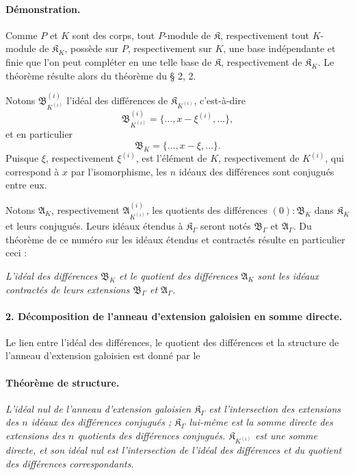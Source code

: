 \paragraph{Démonstration.}
Comme $P$ et $K$ sont des corps, tout $P$-module de $\mathfrak K$, respectivement tout $K$-module de $\mathfrak K_K$, possède sur $P$, respectivement sur $K$, une base indépendante et finie que l'on peut compléter en une telle base de $\mathfrak K$, respectivement de $\mathfrak K_K$. Le théorème résulte alors du théorème du \S{} 2, 2.

Notons $\mathfrak B_{K^{(i)}}^{(i)}$ l'idéal des différences de $\mathfrak K_{K^{(i)}}$, c'est-à-dire
\[
\mathfrak B_{K^{(i)}}^{(i)}=\{\ldots,x-\xi^{(i)},\ldots\},
\]
et en particulier
\[
\mathfrak B_K=\{\ldots,x-\xi,\ldots\}.
\]
Puisque $\xi$, respectivement $\xi^{(i)}$, est l'élément de $K$, respectivement de $K^{(i)}$, qui correspond à $x$ par l'isomorphisme, les $n$ idéaux des différences sont conjugués entre eux.

Notons $\mathfrak A_K$, respectivement $\mathfrak A_{K^{(i)}}^{(i)}$, les quotients des différences $(0):\mathfrak B_K$ dans $\mathfrak K_K$ et leurs conjugués. Leurs idéaux étendus à $\mathfrak K_\Gamma$ seront notés $\mathfrak B_\Gamma$ et $\mathfrak A_\Gamma$. Du théorème de ce numéro sur les idéaux étendus et contractés résulte en particulier ceci :

\emph{L'idéal des différences $\mathfrak B_K$ et le quotient des différences $\mathfrak A_K$ sont les idéaux contractés de leurs extensions $\mathfrak B_\Gamma$ et $\mathfrak A_\Gamma$.}

\paragraph{2. Décomposition de l'anneau d'extension galoisien en somme directe.}
Le lien entre l'idéal des différences, le quotient des différences et la structure de l'anneau d'extension galoisien est donné par le

\paragraph{Théorème de structure.}
\emph{L'idéal nul de l'anneau d'extension galoisien $\mathfrak K_\Gamma$ est l'intersection des extensions des $n$ idéaux des différences conjugués ; $\mathfrak K_\Gamma$ lui-même est la somme directe des extensions des $n$ quotients des différences conjugués. $\mathfrak K_{K^{(i)}}$ est une somme directe, et son idéal nul est l'intersection de l'idéal des différences et du quotient des différences correspondants.}

